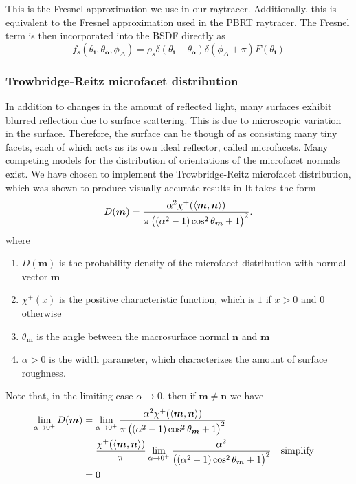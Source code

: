 \documentclass[12pt]{article}
\DeclarePairedDelimiter\ip{\langle }{\rangle}
\begin{document}
This is the Fresnel approximation we use in our raytracer.
Additionally, this is equivalent to the Fresnel approximation used in the PBRT raytracer.
The Fresnel term is then incorporated into the BSDF directly as
\[f_s(\theta_{\bm i}, \theta_{\bm o}, \phi_\Delta) = \rho_s \delta(\theta_{\bm i} - \theta_{\bm o})\delta(\phi_\Delta + \pi)F(\theta_{\bm i})\]

\subsubsection{Trowbridge-Reitz microfacet distribution}

In addition to changes in the amount of reflected light, many surfaces exhibit blurred reflection due to surface scattering.
This is due to microscopic variation in the surface.
Therefore, the surface can be though of as consisting many tiny facets, each of which acts as its own ideal reflector, called microfacets.
Many competing models for the distribution of orientations of the microfacet normals exist.
We have chosen to implement the Trowbridge-Reitz microfacet distribution, which was shown to produce visually accurate results in \autocite{walter2007microfacet}
It takes the form
\[D(\bm m) = \frac{\alpha^2 \chi^+(\ip{\bm m, \bm n})}{\pi\del{\del{\alpha^2 - 1}\cos^2 \theta_{\bm m} + 1}^2}.\]
where
\begin{enumerate}
\item \(D(\bm m)\) is the probability density of the microfacet distribution with normal vector \(\bm m\)
\item \(\chi^+(x)\) is the positive characteristic function, which is \(1\) if \(x>0\) and \(0\) otherwise
\item \(\theta_{\bm m}\) is the angle between the macrosurface normal \(\bm n\) and \(\bm m\)
\item \(\alpha > 0\) is the width parameter, which characterizes the amount of surface roughness.
\end{enumerate}
Note that, in the limiting case \(\alpha \to 0\), then if \(\bm m \neq \bm n\) we have
\begin{align*}
  \lim_{\alpha \to 0^+}D(\bm m)
  &= \lim_{\alpha \to 0^+}\frac{\alpha^2 \chi^+(\ip{\bm m, \bm n})}{\pi\del{\del{\alpha^2 - 1}\cos^2 \theta_{\bm m} + 1}^2}\\
  &= \frac{ \chi^+(\ip{\bm m, \bm n})}{\pi}\lim_{\alpha \to 0^+}\frac{\alpha^2}{\del{\del{\alpha^2 - 1}\cos^2 \theta_{\bm m} + 1}^2} && \text{simplify}\\
  &= 0
\end{align*}
\end{document}
